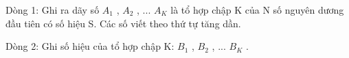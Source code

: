 Dòng 1: Ghi ra dãy số $A_{1}$ , $A_{2}$ , ... $A_{K}$ là tổ hợp chập K của N số nguyên dương đầu tiên có số hiệu S. Các số viết theo thứ tự tăng dần.

Dòng 2: Ghi số hiệu của tổ hợp chập K: $B_{1}$ , $B_{2}$ , ... $B_{K}$ .